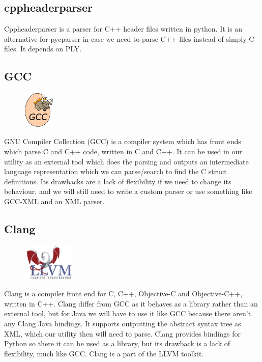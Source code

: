 \subsection{cppheaderparser}
Cppheaderparser is a parser for C++ header files written in python. It is an
alternative for pycparser in case we need to parse C++ files instead of simply
C files. It depends on PLY.

\subsection{GCC}
\begin{figure}
	\begin{center}
	\vspace{-30pt}
		\includegraphics[width=1.5cm]{./planning/img/gcc_logo}
	\vspace{-30pt}
	\end{center}
\end{figure}
GNU Compiler Collection (GCC) is a compiler system which has front ends which
parse C and C++ code, written in C and C++. It can be used in our utility as
an external tool which does the parsing and outputs an intermediate language
representation which we can parse/search to find the C struct definitions. Its
drawbacks are a lack of flexibility if we need to change its behaviour, and we
will still need to write a custom parser or use something like GCC-XML and an
XML parser. 

\subsection{Clang}
\begin{figure}
	\begin{center}
	\vspace{-30pt}
		\includegraphics[width=2.5cm]{./planning/img/llvm_logo}
	\vspace{-30pt}
	\end{center}
\end{figure}
Clang is a compiler front end for C, C++, Objective-C and Objective-C++,
written in C++. Clang differ from GCC as it behaves as a library rather than an
external tool, but for Java we will have to use it like GCC because there
aren’t any Clang Java bindings. It supports outputting the abstract syntax
tree as XML, which our utility then will need to parse. Clang provides bindings
for Python so there it can be used as a library, but its drawback is a lack of
flexibility, much like GCC. Clang is a part of the LLVM toolkit.


